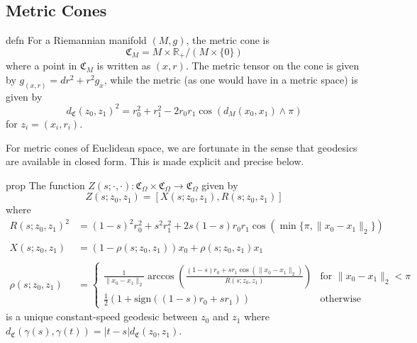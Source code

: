 \documentclass[11pt]{article}
\newcommand{\man}{M}
\begin{document}
\subsection{Metric Cones}

\begin{restatable}{defn}{} \label{def: metric cone}
    For a Riemannian manifold $(\man, g)$, the metric cone is
    \[\mathfrak{C}_\man = \man \times \mathbb{R}_{+} / (M \times \{0\})\]
    where a point in $\mathfrak{C}_\man$ is written as $(x, r)$. The metric tensor on the cone is given by $g_{(x,r)} = dr^2 + r^2g_x$, while the metric (as one would have in a metric space) is given by 
    \begin{equation*}
    d_{\mathfrak{C}}(z_0, z_1)^2 = r_0^2 + r_1^2 - 2r_0r_1\cos(d_{\man}(x_0, x_1) \land \pi)
    \end{equation*}
    for $z_i = (x_i, r_i)$.
\end{restatable} 

For metric cones of Euclidean space, we are fortunate in the sense that geodesics are available in closed form. This is made explicit and precise below.

\begin{restatable}{prop}{}
    The function $Z(s; \cdot, \cdot ):\mathfrak{C}_\Omega \times \mathfrak{C}_\Omega \rightarrow \mathfrak{C}_\Omega$ given by 
    \begin{equation} \label{eq: cone geodesics}
        Z(s; z_0, z_1) = \left[X\left(s; z_0, z_1\right) , R\left(s; z_0, z_1\right)\right]
    \end{equation}
    where
    \begin{align*}
        R(s; z_0, z_1)^2 &= (1-s)^2r_0^2 + s^2r_1^2 + 2s(1-s)r_0r_1\cos(\min\{\pi, \|x_0 - x_1\|_2\}) \\
        \\[0.25ex]X(s; z_0, z_1) &= (1 - \rho(s; z_0, z_1))x_0 + \rho(s; z_0, z_1)x_1 \\
        \\[0.05ex]\rho(s; z_0, z_1) &= \begin{cases}
            \frac{1}{\|x_0 - x_1\|_2}\arccos\left(\frac{(1-s)r_0 + sr_1\cos(\|x_0 - x_1\|_2)}{R(s; z_0, z_1)}\right) & \text{for }\|x_0 - x_1\|_2 < \pi \\
            \frac{1}{2}\left(1 + \text{sign}((1-s)r_0 + sr_1)\right) & \text{otherwise}
        \end{cases}
    \end{align*}
    is a unique constant-speed geodesic between $z_0$ and $z_1$ where $d_{\mathfrak{C}}(\gamma(s), \gamma(t)) = |t-s|d_{\mathfrak{C}}(z_0, z_1)$. 
\end{restatable}
\end{document}
